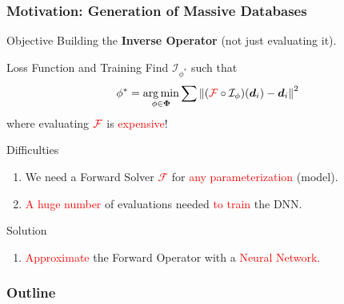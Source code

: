 \documentclass[10pt,aspectratio=169]{beamer}
\begin{document}
\begin{frame}
    \frametitle{Motivation: Generation of Massive Databases}    
\vspace{-2mm}

\begin{block}{Objective}
	\centering
	Building the \textbf{Inverse Operator} (not just evaluating it).
\end{block}

\begin{block}{Loss Function and Training}
Find $\mathcal{I}_{\phi^*}$ such that
\[
\phi^* = \operatorname*{arg\,min}_{\phi \in \boldsymbol{\Phi}} \sum \left\| (\textcolor{red}{\mathcal{F}} \circ \mathcal{I}_{\phi})(\boldsymbol{d}_i) - \boldsymbol{d}_i \right\|^2
\]
where evaluating $\textcolor{red}{\mathcal{F}}$ is \textcolor{red}{expensive}!
\end{block}
    
\begin{block}{Difficulties}
    \begin{enumerate}
        \item We need a Forward Solver \textcolor{red}{$\mathcal{F}$} for \textcolor{red}{any parameterization} (model).
        \item \textcolor{red}{A huge number} of evaluations needed \textcolor{red}{to train} the DNN.
    \end{enumerate}
\end{block}

\begin{block}{Solution}
    \begin{enumerate}
        \item  \textcolor{red}{Approximate} the Forward Operator with a  \textcolor{red}{Neural Network}.
    \end{enumerate}
\end{block}

\end{frame}
\begin{frame}
	\frametitle{Outline}
	\tableofcontents
\end{frame}
\end{document}

